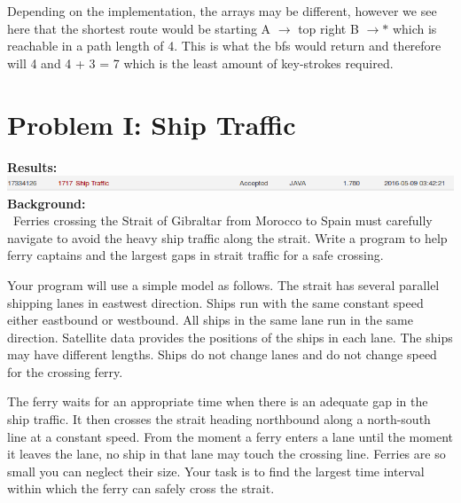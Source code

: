 \documentclass[12pt]{article}
\begin{document}
Depending on the implementation, the arrays may be different, however we see here that the shortest route
would be starting A $\rightarrow$ top right B $\rightarrow \ast$ which is reachable in a path length of 4.
This is what the bfs would return and therefore will 4 and 4 + 3 = 7 which is the least amount of
key-strokes  required.
\newpage








\section{Problem I: Ship Traffic}
\noindent \textbf{Results:} \\

\includegraphics[width=\textwidth]{ProblemI} \\

\noindent \textbf{Background:} \\
~\indent Ferries crossing the Strait of Gibraltar from Morocco to Spain must carefully navigate to avoid the heavy
ship traffic along the strait. Write a program to help ferry captains and the largest gaps in strait traffic for a
safe crossing.

Your program will use a simple model as follows. The strait has several parallel shipping lanes in eastwest direction.
Ships run with the same constant speed either eastbound or westbound. All ships in the same lane run in the same
direction. Satellite data provides the positions of the ships in each lane. The ships may have different lengths.
Ships do not change lanes and do not change speed for the crossing ferry.

The ferry waits for an appropriate time when there is an adequate gap in the ship traffic. It then crosses the
strait heading northbound along a north-south line at a constant speed. From the moment a ferry enters a lane until
the moment it leaves the lane, no ship in that lane may touch the crossing line. Ferries are so small you can neglect
their size. Your task is to find the largest time interval within which the ferry can safely cross the strait. \\
\end{document}
